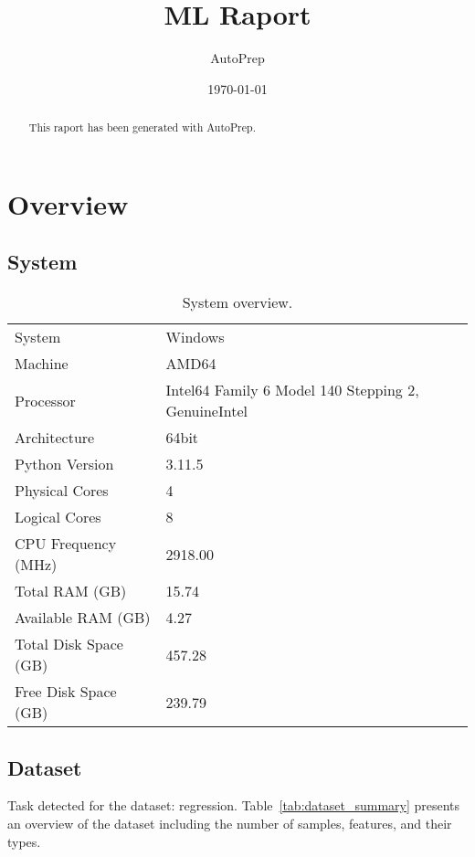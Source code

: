 \documentclass{article}%
\title{ML Raport}%
\author{AutoPrep}%
\date{\today}%
\begin{document}
%
\normalsize%
\maketitle%

    \begin{abstract}
    This raport has been generated with AutoPrep.
    \end{abstract}
\tableofcontents%
\newpage%
\section{Overview}%
\label{sec:Overview}%

%
\subsection{System}%
\label{subsec:System}%

%


\begin{table}[H]%
\begin{center}%
\renewcommand{\arraystretch}{1.5}%
\begin{tabular}{l l}%
\hline%
System&Windows\\%
Machine&AMD64\\%
Processor&Intel64 Family 6 Model 140 Stepping 2, GenuineIntel\\%
Architecture&64bit\\%
Python Version&3.11.5\\%
Physical Cores&4\\%
Logical Cores&8\\%
CPU Frequency (MHz)&2918.00\\%
Total RAM (GB)&15.74\\%
Available RAM (GB)&4.27\\%
Total Disk Space (GB)&457.28\\%
Free Disk Space (GB)&239.79\\%
\hline%
\end{tabular}%
\end{center}%
\caption{System overview.}%
\end{table}

%
\subsection{Dataset}%
\label{subsec:Dataset}%

%
Task detected for the dataset: regression. \newline%
Table~\ref{tab:dataset_summary} %
presents an overview of the dataset including the number of samples, features, and their types.%
\end{document}
